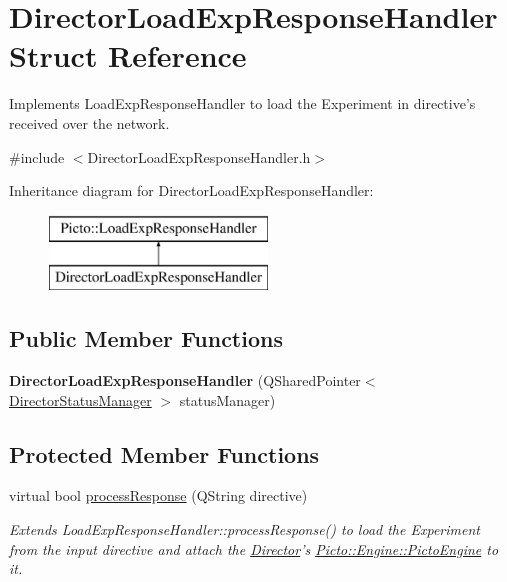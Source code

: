 \hypertarget{struct_director_load_exp_response_handler}{\section{Director\-Load\-Exp\-Response\-Handler Struct Reference}
\label{struct_director_load_exp_response_handler}
}


Implements Load\-Exp\-Response\-Handler to load the Experiment in directive's received over the network.  




{\ttfamily \#include $<$Director\-Load\-Exp\-Response\-Handler.\-h$>$}

Inheritance diagram for Director\-Load\-Exp\-Response\-Handler\-:\begin{figure}[H]
\begin{center}
\leavevmode
\includegraphics[height=2.000000cm]{struct_director_load_exp_response_handler}
\end{center}
\end{figure}
\subsection*{Public Member Functions}
\begin{DoxyCompactItemize}
\item 
\hypertarget{struct_director_load_exp_response_handler_a87e0f4cb75155509dbdd1e4375695c9a}{{\bfseries Director\-Load\-Exp\-Response\-Handler} (Q\-Shared\-Pointer$<$ \hyperlink{class_director_status_manager}{Director\-Status\-Manager} $>$ status\-Manager)}\label{struct_director_load_exp_response_handler_a87e0f4cb75155509dbdd1e4375695c9a}

\end{DoxyCompactItemize}
\subsection*{Protected Member Functions}
\begin{DoxyCompactItemize}
\item 
\hypertarget{struct_director_load_exp_response_handler_ae8c773227dfefa2928a1db2f85faeea8}{virtual bool \hyperlink{struct_director_load_exp_response_handler_ae8c773227dfefa2928a1db2f85faeea8}{process\-Response} (Q\-String directive)}\label{struct_director_load_exp_response_handler_ae8c773227dfefa2928a1db2f85faeea8}

\begin{DoxyCompactList}\small\item\em Extends Load\-Exp\-Response\-Handler\-::process\-Response() to load the Experiment from the input directive and attach the \hyperlink{class_director}{Director}'s \hyperlink{class_picto_1_1_engine_1_1_picto_engine}{Picto\-::\-Engine\-::\-Picto\-Engine} to it. \end{DoxyCompactList}\end{DoxyCompactItemize}


